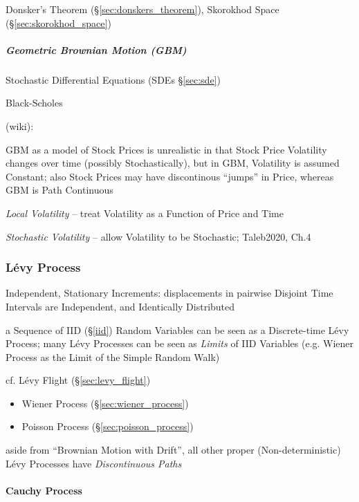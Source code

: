 \fist Donsker's Theorem (\S\ref{sec:donskers_theorem}), Skorokhod Space
(\S\ref{sec:skorokhod_space})



\subparagraph{Geometric Brownian Motion (GBM)}\label{sec:gbm}\hfill

Stochastic Differential Equations (SDEs \S\ref{sec:sde})

Black-Scholes

(wiki):

GBM as a model of Stock Prices is unrealistic in that Stock Price Volatility
changes over time (possibly Stochastically), but in GBM, Volatility is assumed
Constant; also Stock Prices may have discontinous ``jumps'' in Price, whereas
GBM is Path Continuous

\emph{Local Volatility} -- treat Volatility as a Function of Price and Time

\emph{Stochastic Volatility} -- allow Volatility to be Stochastic;
Taleb2020, Ch.4



\subsubsection{L\'evy Process}\label{sec:levy_process}

Independent, Stationary Increments: displacements in pairwise Disjoint Time
Intervals are Independent, and Identically Distributed

\fist a Sequence of IID (\S\ref{iid}) Random Variables can be seen as a
Discrete-time L\'evy Process; many L\'evy Processes can be seen as \emph{Limits}
of IID Variables (e.g. Wiener Process as the Limit of the Simple Random Walk)

\fist cf. L\'evy Flight (\S\ref{sec:levy_flight})

\begin{itemize}
  \item Wiener Process (\S\ref{sec:wiener_process})
  \item Poisson Process (\S\ref{sec:poisson_process})
\end{itemize}

aside from ``Brownian Motion with Drift'', all other proper (Non-deterministic)
L\'evy Processes have \emph{Discontinuous Paths}



\paragraph{Cauchy Process}\label{sec:cauchy_process}\hfill

